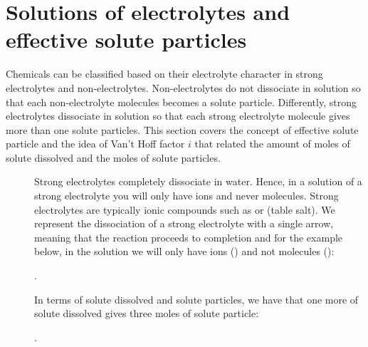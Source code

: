 \documentclass[main.tex]{subfiles}
\begin{document}
\section{Solutions of electrolytes and effective solute particles}
Chemicals can be classified based on their electrolyte character in strong electrolytes and non-electrolytes. Non-electrolytes do not dissociate in solution so that each non-electrolyte molecules becomes a solute particle. Differently, strong electrolytes dissociate in solution so that each strong electrolyte molecule gives more than one solute particles. This section covers the concept of effective solute particle and the idea of Van't Hoff factor $i$ that related the amount of moles of solute dissolved and the moles of solute particles.
\sloppy 
\begin{description}
\item[] 
 Strong electrolytes completely dissociate in water. Hence, in a solution of a strong electrolyte you will only have ions and never molecules. Strong electrolytes are typically ionic compounds such as  or  (table salt). We represent the dissociation of a strong electrolyte with a single arrow, meaning that the reaction proceeds to completion and for the example below, in the solution we will only have ions () and not molecules ():
\begin{center}.\end{center}
In terms of solute dissolved and solute particles, we have that one more of solute dissolved gives three moles of solute particle:
\begin{center}.\end{center}


\end{description}
\end{document}
